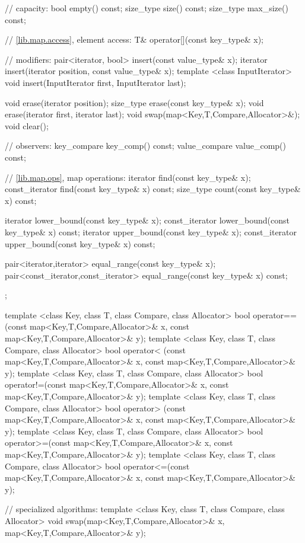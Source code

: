 \begin{codeblock}
{{    // capacity:
    bool      empty() const;
    size_type size() const;
    size_type max_size() const;

    // \ref{lib.map.access}, element access:
    T& operator[](const key_type& x);

    // modifiers:
    pair<iterator, bool> insert(const value_type& x);
    iterator             insert(iterator position, const value_type& x);
    template <class InputIterator>
      void insert(InputIterator first, InputIterator last);

    void      erase(iterator position);
    size_type erase(const key_type& x);
    void      erase(iterator first, iterator last);
    void swap(map<Key,T,Compare,Allocator>&);
    void clear();

    // observers:
    key_compare   key_comp() const;
    value_compare value_comp() const;

    // \ref{lib.map.ops}, map operations:
    iterator       find(const key_type& x);
    const_iterator find(const key_type& x) const;
    size_type      count(const key_type& x) const;

    iterator       lower_bound(const key_type& x);
    const_iterator lower_bound(const key_type& x) const;
    iterator       upper_bound(const key_type& x);
    const_iterator upper_bound(const key_type& x) const;

    pair<iterator,iterator>
      equal_range(const key_type& x);
    pair<const_iterator,const_iterator>
      equal_range(const key_type& x) const;
  };

  template <class Key, class T, class Compare, class Allocator>
    bool operator==(const map<Key,T,Compare,Allocator>& x,
                    const map<Key,T,Compare,Allocator>& y);
  template <class Key, class T, class Compare, class Allocator>
    bool operator< (const map<Key,T,Compare,Allocator>& x,
                    const map<Key,T,Compare,Allocator>& y);
  template <class Key, class T, class Compare, class Allocator>
    bool operator!=(const map<Key,T,Compare,Allocator>& x,
                    const map<Key,T,Compare,Allocator>& y);
  template <class Key, class T, class Compare, class Allocator>
    bool operator> (const map<Key,T,Compare,Allocator>& x,
                    const map<Key,T,Compare,Allocator>& y);
  template <class Key, class T, class Compare, class Allocator>
    bool operator>=(const map<Key,T,Compare,Allocator>& x,
                    const map<Key,T,Compare,Allocator>& y);
  template <class Key, class T, class Compare, class Allocator>
    bool operator<=(const map<Key,T,Compare,Allocator>& x,
                    const map<Key,T,Compare,Allocator>& y);

  // specialized algorithms:
  template <class Key, class T, class Compare, class Allocator>
    void swap(map<Key,T,Compare,Allocator>& x,
              map<Key,T,Compare,Allocator>& y);
}
\end{codeblock}


